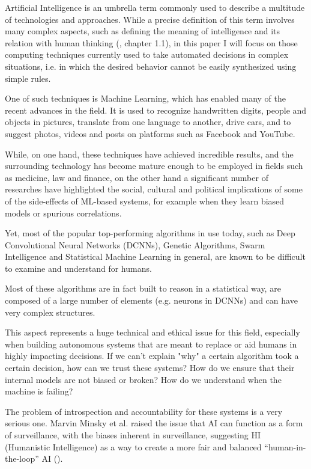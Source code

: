 \documentclass[conference]{IEEEtran}
\begin{document}
Artificial Intelligence is an umbrella term commonly used to describe a
multitude of technologies and approaches. While a precise definition of this
term involves many complex aspects, such as defining the meaning of intelligence
and its relation with human thinking (\cite{norvig}, chapter 1.1), in this
paper I will focus on those computing techniques currently used to
take automated decisions in complex situations, i.e. in which the desired
behavior cannot be easily synthesized using simple rules.

One of such techniques is Machine Learning, which has enabled many of the recent
advances in the field. It is used to recognize handwritten digits, people and
objects in pictures, translate from one language to another, drive cars, and to
suggest photos, videos and posts on platforms such as Facebook and YouTube.

While, on one hand, these techniques have achieved incredible results, and the
surrounding technology has become mature enough to be employed in fields such as
medicine, law and finance, on the other hand a significant number of researches have
highlighted the social, cultural and political implications of some of the
side-effects of ML-based systems, for example when they learn biased models or
spurious correlations.

Yet, most of the popular top-performing algorithms in use today, such as Deep
Convolutional Neural Networks (DCNNs), Genetic Algorithms, Swarm Intelligence
and Statistical Machine Learning in general, are known to be difficult to
examine and understand for humans.

Most of these algorithms are in fact built to reason in a statistical way, are
composed of a large number of elements (e.g. neurons in DCNNs) and can have very
complex structures.

This aspect represents a huge technical and ethical issue for this field,
especially when building autonomous systems that are meant to replace or aid
humans in highly impacting decisions. If we can't explain "why" a certain
algorithm took a certain decision, how can we trust these systems? How do we
ensure that their internal models are not biased or broken? How do we understand
when the machine is failing?

The problem of introspection and accountability for these systems is a very
serious one. Marvin Minsky et al. raised the issue that AI can function as a
form of surveillance, with the biases inherent in surveillance, suggesting HI
(Humanistic Intelligence) as a way to create a more fair and balanced
``human-in-the-loop'' AI (\cite{minsky}).
\end{document}
